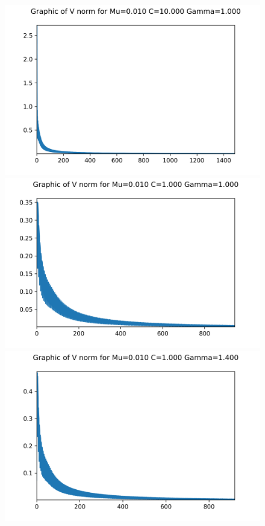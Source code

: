 \begin{figure}[H]
	\centering
	\includegraphics[scale=0.65]{../graphs_data_nonsmooth_1/norms/Graph_V_norms_mu0.010_C10.000_gamma1.000.png}
	\includegraphics[scale=0.65]{../graphs_data_nonsmooth_1/norms/Graph_V_norms_mu0.010_C1.000_gamma1.000.png}	
	\includegraphics[scale=0.65]{../graphs_data_nonsmooth_1/norms/Graph_V_norms_mu0.010_C1.000_gamma1.400.png}
\end{figure}


